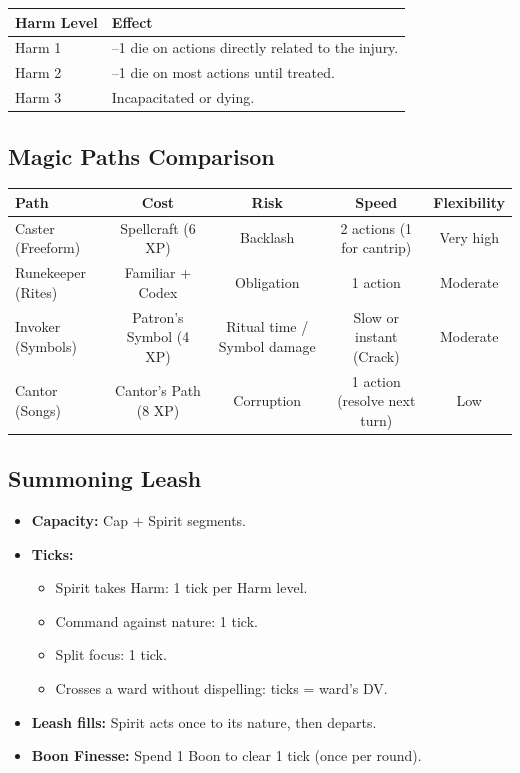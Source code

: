 \begin{tabular}{@{}ll@{}}
\toprule
\textbf{Harm Level} & \textbf{Effect} \\
\midrule
Harm 1 & --1 die on actions directly related to the injury. \\
Harm 2 & --1 die on most actions until treated. \\
Harm 3 & Incapacitated or dying. \\
\bottomrule
\end{tabular}

\subsection{Magic Paths Comparison}

\begin{tabular}{@{}lcccc@{}}
\toprule
\textbf{Path} & \textbf{Cost} & \textbf{Risk} & \textbf{Speed} & \textbf{Flexibility} \\
\midrule
Caster (Freeform) & Spellcraft (6 XP) & Backlash & 2 actions (1 for cantrip) & Very high \\
Runekeeper (Rites) & Familiar + Codex & Obligation & 1 action & Moderate \\
Invoker (Symbols) & Patron's Symbol (4 XP) & Ritual time / Symbol damage & Slow or instant (Crack) & Moderate \\
Cantor (Songs) & Cantor's Path (8 XP) & Corruption & 1 action (resolve next turn) & Low \\
\bottomrule
\end{tabular}

\subsection{Summoning Leash}

\begin{itemize}
  \item \textbf{Capacity:} Cap + Spirit segments.
  \item \textbf{Ticks:}
  \begin{itemize}
    \item Spirit takes Harm: 1 tick per Harm level.
    \item Command against nature: 1 tick.
    \item Split focus: 1 tick.
    \item Crosses a ward without dispelling: ticks = ward's DV.
  \end{itemize}
  \item \textbf{Leash fills:} Spirit acts once to its nature, then departs.
  \item \textbf{Boon Finesse:} Spend 1 Boon to clear 1 tick (once per round).
\end{itemize}

